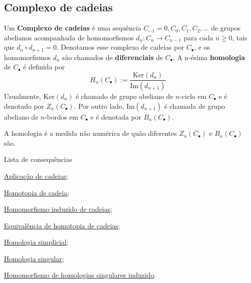\subsection{Complexo de cadeias}
\label{complexo-de-cadeias-def}


\begin{defi}
	Um \textbf{Complexo de cadeias} é uma sequência $C_{-1}=0,C_0,C_1, C_2,...$ de grupos abelianos acompanhada de homomorfismos $d_n:C_n\rightarrow C_{n-1}$ para cada $n\ge 0$, tais que $d_{n}\circ d_{n+1}=0$. Denotamos esse complexo de cadeias por $C_{\bullet}$, e os homomorfismos $d_n$ são chamados de \textbf{diferenciais} de $C_\bullet$. A n-ésima \textbf{homologia} de $C_\bullet$ é definida por
    \[H_n(C_\bullet):=\frac{\text{Ker}(d_n)}{\text{Im}(d_{n+1})}\]
    Usualmente, $\text{Ker}(d_n)$ é chamado de grupo abeliano de $n$-ciclo em $C_\bullet$ e é denotado por $Z_n(C_\bullet)$. Por outro lado, $\text{Im}(d_{n+1})$ é chamada de grupo abeliano de $n$-bordos em $C_\bullet$ e é denotada por $B_n(C_\bullet)$.
\end{defi}

A homologia é a medida não numérica de quão diferentes $Z_n(C_\bullet)$ e $B_n(C_\bullet)$ são.

\begin{titlemize}{Lista de consequências}
    \item \hyperref[aplicacao-de-cadeias-def]{Aplicação de cadeias};\\
    \item \hyperref[homotopia-de-cadeias-def]{Homotopia de cadeia};\\
    \item \hyperref[homomorfismo-induzido-de-cadeias-prop]{Homomorfismo induzido de cadeias};\\
    \item \hyperref[equivalencia-de-homotopia-de-cadeias-def]{Equivalência de homotopia de cadeias};\\
    \item \hyperlink{homologia-simplicial-def}{Homologia simplicial};\\
    \item \hyperref[homologia-singular-def]{Homologia singular};\\
    \item \hyperref[homomorfismo-de-homologias-singulares-induzido-prop]{Homomorfismo de homologias singulares induzido}.
\end{titlemize}
